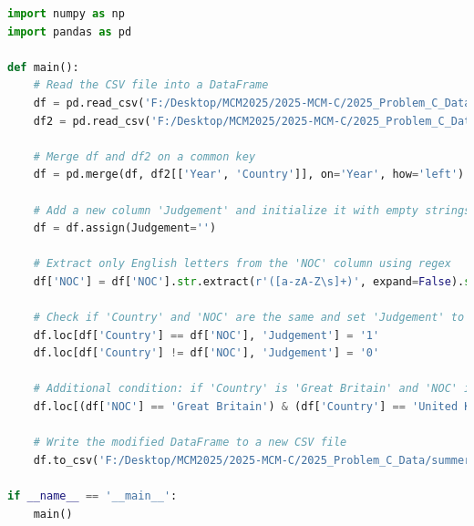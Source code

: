 \documentclass[12pt]{article}
\begin{document}
\begin{lstlisting}[language=Python, style=mystyle, caption=data\_process\_medal\_counts.py]
import numpy as np
import pandas as pd

def main():
    # Read the CSV file into a DataFrame
    df = pd.read_csv('F:/Desktop/MCM2025/2025-MCM-C/2025_Problem_C_Data/summerOly_medal_counts.csv')
    df2 = pd.read_csv('F:/Desktop/MCM2025/2025-MCM-C/2025_Problem_C_Data/summerOly_hosts_completed.csv')

    # Merge df and df2 on a common key
    df = pd.merge(df, df2[['Year', 'Country']], on='Year', how='left')

    # Add a new column 'Judgement' and initialize it with empty strings
    df = df.assign(Judgement='')

    # Extract only English letters from the 'NOC' column using regex
    df['NOC'] = df['NOC'].str.extract(r'([a-zA-Z\s]+)', expand=False).str.rstrip()

    # Check if 'Country' and 'NOC' are the same and set 'Judgement' to '1' if they are, otherwise set it to '0'
    df.loc[df['Country'] == df['NOC'], 'Judgement'] = '1'
    df.loc[df['Country'] != df['NOC'], 'Judgement'] = '0'

    # Additional condition: if 'Country' is 'Great Britain' and 'NOC' is 'United Kingdom', set 'Judgement' to '1'
    df.loc[(df['NOC'] == 'Great Britain') & (df['Country'] == 'United Kingdom'), 'Judgement'] = '1'

    # Write the modified DataFrame to a new CSV file
    df.to_csv('F:/Desktop/MCM2025/2025-MCM-C/2025_Problem_C_Data/summerOly_medal_counts_completed.csv', index=False, encoding='utf-8')

if __name__ == '__main__':
    main()
\end{lstlisting}
\end{document}
